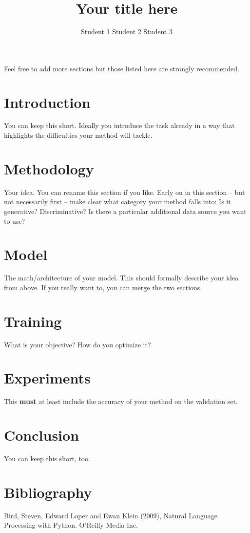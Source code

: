 \documentclass{article}
\title{Your title here}
\author{Student 1 \qquad Student 2 \qquad Student 3}
\begin{document}

\maketitle


Feel free to add more sections but those listed here are strongly recommended.
\section{Introduction}
You can keep this short. Ideally you introduce the task already in a way that highlights the difficulties  your method will tackle.

\section{Methodology}
Your idea. You can rename this section if you like. Early on in this section -- but not necessarily first -- make clear what category your method falls into: Is it generative? Discriminative? Is there a particular additional data source you want to use?

\section{Model}
The math/architecture of your model. This should formally describe your idea from above. If you really want to, you can merge the two sections.

\section{Training}
What is your objective? How do you optimize it?

\section{Experiments}
This {\bf must} at least include the accuracy of your method on the validation set.

\section{Conclusion}
You can keep this short, too.

\section{Bibliography}
Bird, Steven, Edward Loper and Ewan Klein (2009), Natural Language Processing with Python. O’Reilly Media Inc.
\end{document}
